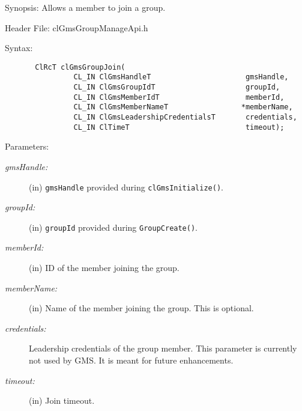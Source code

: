 \begin{flushleft}
\begin{Desc}
    \item[Synopsis:]
Allows a member to join a group.  \end{Desc}

    \begin{Desc}
      \item[Header File:]
      clGmsGroupManageApi.h\end{Desc}

      \begin{Desc}
      \item[Syntax:]
      \footnotesize\begin{verbatim}
       ClRcT clGmsGroupJoin(
          		CL_IN ClGmsHandleT                      gmsHandle,
          		CL_IN ClGmsGroupIdT                     groupId,
          		CL_IN ClGmsMemberIdT                    memberId,
          		CL_IN ClGmsMemberNameT                 *memberName,
          		CL_IN ClGmsLeadershipCredentialsT       credentials,
          		CL_IN ClTimeT                           timeout);

     \end{verbatim}
      \normalsize
      \end{Desc}

     \begin{Desc}
    \item[Parameters:]
    \begin{description}
      \item[{\em gmsHandle:}] (in) {\tt{gmsHandle}} provided during {\tt{clGmsInitialize()}}.
     \item[{\em groupId:}] (in) {\tt{groupId}} provided during {\tt{GroupCreate()}}.
    \item[{\em memberId:}] (in) ID of the member joining the group.
    \item[{\em memberName:}] (in) Name of the member joining the group. This is optional.
    \item[{\em credentials:}] Leadership credentials of the group member. This parameter is currently not used by GMS. It is meant for future 
    enhancements.
    \item[{\em timeout:}] (in) Join timeout.

   \end{description}
     \end{Desc}


\end{flushleft}
